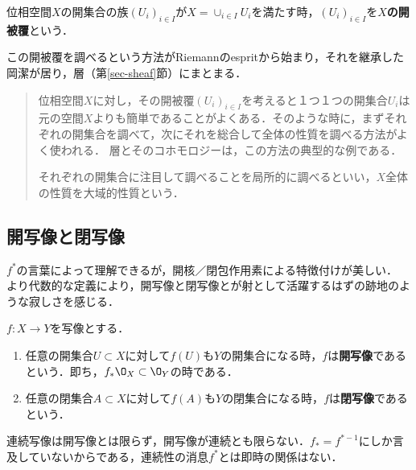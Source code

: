 \documentclass[uplatex,dvipdfmx]{jsreport}
\begin{document}
\begin{definition}
    位相空間$X$の開集合の族$(U_i)_{i\in I}$が$X=\cup_{i\in I}U_i$を満たす時，$(U_i)_{i\in I}$を\textbf{$X$の開被覆}という．
\end{definition}
\begin{remark}
    この開被覆を調べるという方法がRiemannのespritから始まり，それを継承した岡潔が居り，層（第\ref{sec-sheaf}節）にまとまる．
    \begin{quotation}
        位相空間$X$に対し，その開被覆$(U_i)_{i\in I}$を考えると１つ１つの開集合$U_i$は元の空間$X$よりも簡単であることがよくある．そのような時に，まずそれぞれの開集合を調べて，次にそれを総合して全体の性質を調べる方法がよく使われる．
        層とそのコホモロジーは，この方法の典型的な例である．

        それぞれの開集合に注目して調べることを局所的に調べるといい，$X$全体の性質を大域的性質という．\cite{斎藤毅}
    \end{quotation}
\end{remark}

\subsection{開写像と閉写像}

\begin{tcolorbox}[colframe=ForestGreen, colback=ForestGreen!10!white, breakable,
    title=開写像と閉写像]
    $f^*$の言葉によって理解できるが，開核／閉包作用素による特徴付けが美しい．
    より代数的な定義により，開写像と閉写像とが射として活躍するはずの跡地のような寂しさを感じる．
\end{tcolorbox}

\begin{definition}
    $f:X\to Y$を写像とする．
    \begin{enumerate}
        \item 任意の開集合$U\subset X$に対して$f(U)$も$Y$の開集合になる時，$f$は\textbf{開写像}であるという．即ち，$f_*\O_X\subset \O_Y$の時である．
        \item 任意の閉集合$A\subset X$に対して$f(A)$も$Y$の閉集合になる時，$f$は\textbf{閉写像}であるという．
    \end{enumerate}
    連続写像は開写像とは限らず，開写像が連続とも限らない．$f_*=f^{*-1}$にしか言及していないからである，連続性の消息$f^*$とは即時の関係はない．
\end{definition}
\end{document}
